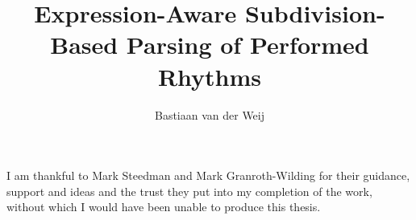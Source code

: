 \documentclass[logo,msc,cogsci]{infthesis/infthesis}
\title{Expression-Aware Subdivision-Based Parsing of Performed Rhythms}
\author{Bastiaan van der Weij}
\begin{document}
\begin{preliminary}
\maketitle
\begin{acknowledgements}

I am thankful to Mark Steedman and Mark Granroth-Wilding for their guidance, support and ideas and the trust they put into my completion of the work, without which I would have been unable to produce this thesis.

\end{acknowledgements}

\standarddeclaration


\tableofcontents


\end{preliminary}



%
%





%
\appendix




\end{document}
